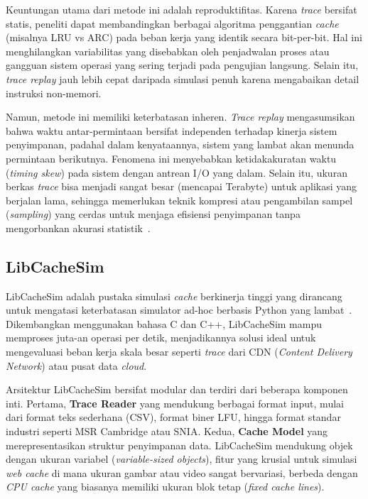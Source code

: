 Keuntungan utama dari metode ini adalah reproduktifitas.
Karena \textit{trace} bersifat statis, peneliti dapat membandingkan
berbagai algoritma penggantian \textit{cache} (misalnya LRU vs ARC)
pada beban kerja yang identik secara bit-per-bit.
Hal ini menghilangkan variabilitas yang disebabkan oleh penjadwalan proses
atau gangguan sistem operasi yang sering terjadi pada pengujian langsung.
Selain itu, \textit{trace replay} jauh lebih cepat daripada simulasi penuh
karena mengabaikan detail instruksi non-memori.

Namun, metode ini memiliki keterbatasan inheren.
\textit{Trace replay} mengasumsikan bahwa waktu antar-permintaan bersifat
independen terhadap kinerja sistem penyimpanan, padahal dalam kenyataannya,
sistem yang lambat akan menunda permintaan berikutnya.
Fenomena ini menyebabkan ketidakakuratan waktu (\textit{timing skew})
pada sistem dengan antrean I/O yang dalam.
Selain itu, ukuran berkas \textit{trace} bisa menjadi sangat besar
(mencapai Terabyte) untuk aplikasi yang berjalan lama,
sehingga memerlukan teknik kompresi atau pengambilan sampel (\textit{sampling})
yang cerdas untuk menjaga efisiensi penyimpanan tanpa mengorbankan
akurasi statistik~\cite{Yang2021A}.

\subsection{LibCacheSim}
LibCacheSim adalah pustaka simulasi \textit{cache} berkinerja tinggi yang
dirancang untuk mengatasi keterbatasan simulator ad-hoc berbasis Python
yang lambat~\cite{Yang2021A}.
Dikembangkan menggunakan bahasa C dan C++, LibCacheSim mampu memproses
juta-an operasi per detik, menjadikannya solusi ideal untuk mengevaluasi
beban kerja skala besar seperti \textit{trace} dari CDN
(\textit{Content Delivery Network})
atau pusat data \textit{cloud}.

Arsitektur LibCacheSim bersifat modular dan terdiri dari beberapa komponen inti.
Pertama, \textbf{Trace Reader} yang mendukung berbagai format input,
mulai dari format teks sederhana (CSV), format biner LFU, hingga format
standar industri seperti MSR Cambridge atau SNIA.
Kedua, \textbf{Cache Model} yang merepresentasikan struktur penyimpanan data.
LibCacheSim mendukung objek dengan ukuran variabel
(\textit{variable-sized objects}),
fitur yang krusial untuk simulasi \textit{web cache} di mana ukuran gambar
atau video sangat bervariasi, berbeda dengan \textit{CPU cache} yang biasanya
memiliki ukuran blok tetap (\textit{fixed cache lines}).

